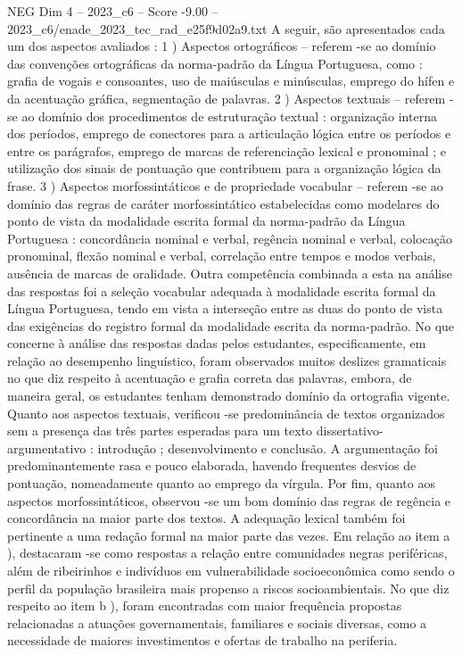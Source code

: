 \begin{textsample}{NEG Dim 4 – 2023\_c6 – Score -9.00 – 2023\_c6/enade\_2023\_tec\_rad\_e25f9d02a9.txt}
A seguir, são apresentados cada um dos aspectos avaliados : 1 ) Aspectos ortográficos – referem -se ao domínio das convenções ortográficas da norma-padrão da Língua Portuguesa, como : grafia de vogais e consoantes, uso de maiúsculas e minúsculas, emprego do hífen e da acentuação gráfica, segmentação de palavras. 2 ) Aspectos textuais – referem -se ao domínio dos procedimentos de estruturação textual : organização interna dos períodos, emprego de conectores para a articulação lógica entre os períodos e entre os parágrafos, emprego de marcas de referenciação lexical e pronominal ; e utilização dos sinais de pontuação que contribuem para a organização lógica da frase. 3 ) Aspectos morfossintáticos e de propriedade vocabular – referem -se ao domínio das regras de caráter morfossintático estabelecidas como modelares do ponto de vista da modalidade escrita formal da norma-padrão da Língua Portuguesa : concordância nominal e verbal, regência nominal e verbal, colocação pronominal, flexão nominal e verbal, correlação entre tempos e modos verbais, ausência de marcas de oralidade.
Outra competência combinada a esta na análise das respostas foi a seleção vocabular adequada à modalidade escrita formal da Língua Portuguesa, tendo em vista a interseção entre as duas do ponto de vista das exigências do registro formal da modalidade escrita da norma-padrão.
No que concerne à análise das respostas dadas pelos estudantes, especificamente, em relação ao desempenho linguístico, foram observados muitos deslizes gramaticais no que diz respeito à acentuação e grafia correta das palavras, embora, de maneira geral, os estudantes tenham demonstrado domínio da ortografia vigente.
Quanto aos aspectos textuais, verificou -se predominância de textos organizados sem a presença das três partes esperadas para um texto dissertativo-argumentativo : introdução ; desenvolvimento e conclusão.
A argumentação foi predominantemente rasa e pouco elaborada, havendo frequentes desvios de pontuação, nomeadamente quanto ao emprego da vírgula.
Por fim, quanto aos aspectos morfossintáticos, observou -se um bom domínio das regras de regência e concordância na maior parte dos textos.
A adequação lexical também foi pertinente a uma redação formal na maior parte das vezes.
Em relação ao item a ), destacaram -se como respostas a relação entre comunidades negras periféricas, além de ribeirinhos e indivíduos em vulnerabilidade socioeconômica como sendo o perfil da população brasileira mais propenso a riscos socioambientais.
No que diz respeito ao item b ), foram encontradas com maior frequência propostas relacionadas a atuações governamentais, familiares e sociais diversas, como a necessidade de maiores investimentos e ofertas de trabalho na periferia.

\end{textsample}
